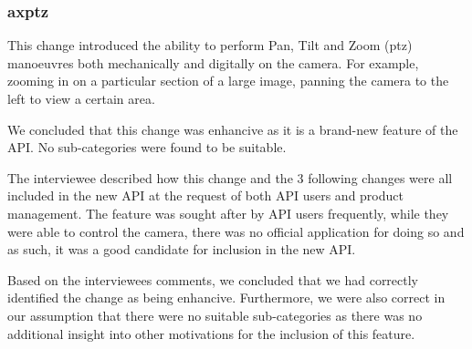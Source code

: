 \documentclass{sig-alternate}
\begin{document}




\subsubsection{axptz}

This change introduced the ability to perform Pan, Tilt and Zoom (ptz) manoeuvres both mechanically and digitally on the camera. For example, zooming in on a particular section of a large image, panning the camera to the left to view a certain area. 

We concluded that this change was enhancive as it is a brand-new feature of the API. No sub-categories were found to be suitable.

The interviewee described how this change and the 3 following changes were all included in the new API at the request of both API users and product management. The feature was sought after by API users frequently, while they were able to control the camera, there was no official application for doing so and as such, it was a good candidate for inclusion in the new API.

Based on the interviewees comments, we concluded that we had correctly identified the change as being enhancive. Furthermore, we were also correct in our assumption that there were no suitable sub-categories as there was no additional insight into other motivations for the inclusion of this feature. 
\end{document}
